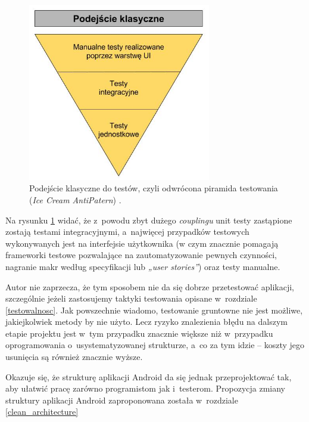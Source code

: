 \begin{figure}[!htb]
    \centering
    \includegraphics[width=8cm]{imgs/ch3_odwrocona_piramida.jpg}
    \caption
{Podejście klasyczne do testów, czyli odwrócona piramida testowania (\textit{Ice Cream AntiPatern}) \cite{website:piramidatestow}.}
    \label{fig:odwrocona_piramida}
\end{figure} 

Na rysunku \ref{fig:odwrocona_piramida} widać, że z~powodu zbyt dużego \textit{couplingu} unit testy zastąpione zostają testami integracyjnymi, a~najwięcej przypadków testowych wykonywanych jest na interfejsie użytkownika (w czym znacznie pomagają frameworki testowe pozwalające na zautomatyzowanie pewnych czynności, nagranie makr według specyfikacji lub \textit{„user stories”}) oraz testy manualne.

Autor nie zaprzecza, że tym sposobem nie da się dobrze przetestować aplikacji, szczególnie jeżeli zastosujemy taktyki testowania opisane w~rozdziale \ref{testowalnosc}. Jak powszechnie wiadomo, testowanie gruntowne nie jest możliwe, jakiejkolwiek metody by nie użyto. Lecz ryzyko znalezienia błędu na dalszym etapie projektu jest w~tym przypadku znacznie większe niż w~przypadku oprogramowania o~usystematyzowanej strukturze, a~co za tym idzie – koszty jego usunięcia są również znacznie wyższe.

Okazuje się, że strukturę aplikacji Android da się jednak przeprojektować tak, aby ułatwić pracę zarówno programistom jak i~testerom. Propozycja zmiany struktury aplikacji Android zaproponowana została w~rozdziale \ref{clean_architecture}

